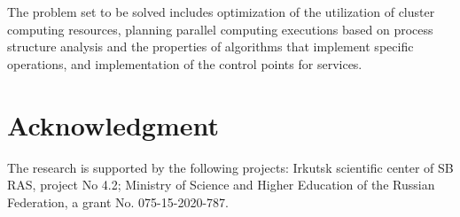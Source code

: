 \documentclass[a4paper]{jpconf}
\begin{document}
The problem set to be solved includes optimization of the utilization of cluster computing resources, planning parallel computing executions based on process structure analysis and the properties of algorithms that implement specific operations, and implementation of the control points for services.

\section*{Acknowledgment}
The research is supported by the following projects: Irkutsk scientific center of SB RAS, project No 4.2; Ministry of Science and Higher Education of the Russian
Federation, a grant No. 075-15-2020-787.







\end{document}
